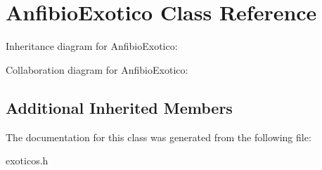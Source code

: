 \hypertarget{classAnfibioExotico}{}\section{Anfibio\+Exotico Class Reference}
\label{classAnfibioExotico}


Inheritance diagram for Anfibio\+Exotico\+:


Collaboration diagram for Anfibio\+Exotico\+:
\subsection*{Additional Inherited Members}


The documentation for this class was generated from the following file\+:\begin{DoxyCompactItemize}
\item 
exoticos.\+h\end{DoxyCompactItemize}
